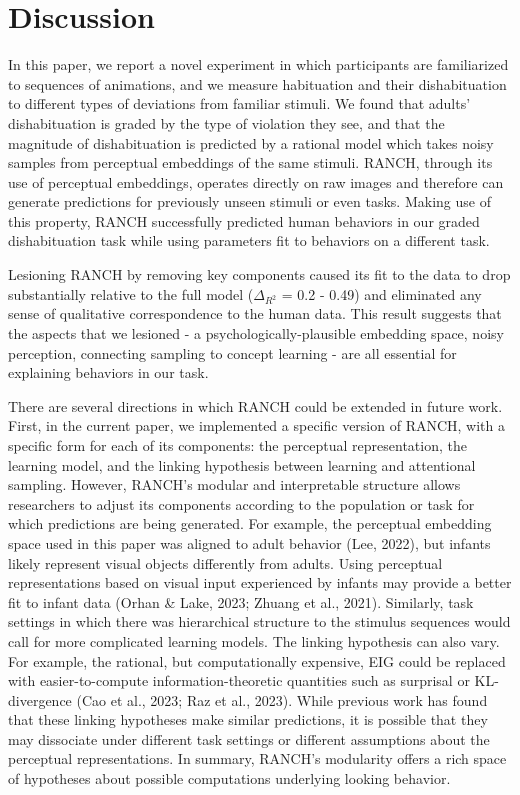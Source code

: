 \documentclass[10pt, letterpaper]{article}
\begin{document}
\hypertarget{discussion}{%
\section{Discussion}\label{discussion}}

In this paper, we report a novel experiment in which participants are
familiarized to sequences of animations, and we measure habituation and
their dishabituation to different types of deviations from familiar
stimuli. We found that adults' dishabituation is graded by the type of
violation they see, and that the magnitude of dishabituation is
predicted by a rational model which takes noisy samples from perceptual
embeddings of the same stimuli. RANCH, through its use of perceptual
embeddings, operates directly on raw images and therefore can generate
predictions for previously unseen stimuli or even tasks. Making use of
this property, RANCH successfully predicted human behaviors in our
graded dishabituation task while using parameters fit to behaviors on a
different task.

Lesioning RANCH by removing key components caused its fit to the data to
drop substantially relative to the full model (\(\Delta_{R^2}\) = 0.2 -
0.49) and eliminated any sense of qualitative correspondence to the
human data. This result suggests that the aspects that we lesioned - a
psychologically-plausible embedding space, noisy perception, connecting
sampling to concept learning - are all essential for explaining
behaviors in our task.

There are several directions in which RANCH could be extended in future
work. First, in the current paper, we implemented a specific version of
RANCH, with a specific form for each of its components: the perceptual
representation, the learning model, and the linking hypothesis between
learning and attentional sampling. However, RANCH's modular and
interpretable structure allows researchers to adjust its components
according to the population or task for which predictions are being
generated. For example, the perceptual embedding space used in this
paper was aligned to adult behavior (Lee, 2022), but infants likely
represent visual objects differently from adults. Using perceptual
representations based on visual input experienced by infants may provide
a better fit to infant data (Orhan \& Lake, 2023; Zhuang et al., 2021).
Similarly, task settings in which there was hierarchical structure to
the stimulus sequences would call for more complicated learning models.
The linking hypothesis can also vary. For example, the rational, but
computationally expensive, EIG could be replaced with easier-to-compute
information-theoretic quantities such as surprisal or KL-divergence (Cao
et al., 2023; Raz et al., 2023). While previous work has found that
these linking hypotheses make similar predictions, it is possible that
they may dissociate under different task settings or different
assumptions about the perceptual representations. In summary, RANCH's
modularity offers a rich space of hypotheses about possible computations
underlying looking behavior.
\end{document}
